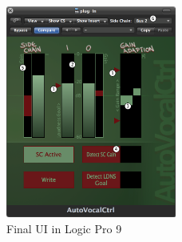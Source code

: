 \begin{figure}[H]
\includegraphics[width=0.5\textwidth]{images/designNeuNum}
	\centering
	\caption{Final UI in Logic Pro 9}
	\label{UInew}
\end{figure}

